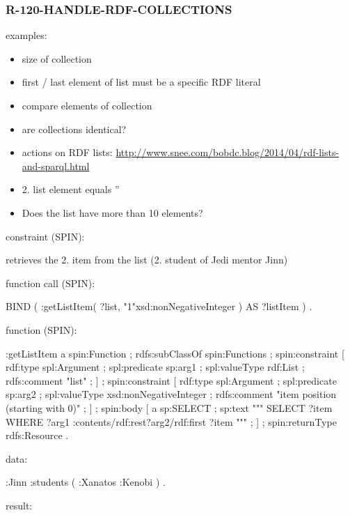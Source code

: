 \documentclass{llncs}
\begin{document}
\subsubsection{R-120-HANDLE-RDF-COLLECTIONS}

examples:

\begin{itemize}
	\item size of collection
	\item first / last element of list must be a specific RDF literal
	\item compare elements of collection
	\item are collections identical?
	\item actions on RDF lists: \url{http://www.snee.com/bobdc.blog/2014/04/rdf-lists-and-sparql.html}
	\item 2. list element equals ''
	\item Does the list have more than 10 elements?
\end{itemize}

constraint (SPIN):

retrieves the 2. item from the list (2. student of Jedi mentor Jinn)

function call (SPIN):

\begin{ex}
BIND ( :getListItem( ?list, "1"xsd:nonNegativeInteger ) AS ?listItem ) .
\end{ex}

function (SPIN):

\begin{ex}
:getListItem
    a spin:Function ; rdfs:subClassOf spin:Functions ;
    spin:constraint [
        rdf:type spl:Argument ;
        spl:predicate sp:arg1 ;
        spl:valueType rdf:List ;
        rdfs:comment "list" ; ] ;
    spin:constraint [
        rdf:type spl:Argument ;
        spl:predicate sp:arg2 ;
        spl:valueType xsd:nonNegativeInteger ;
        rdfs:comment "item position (starting with 0)" ; ] ;
    spin:body [
        a sp:SELECT ;
        sp:text """
            SELECT ?item
            WHERE {
                ?arg1 :contents/rdf:rest{?arg2}/rdf:first ?item } """ ; ] ;
    spin:returnType rdfs:Resource .
\end{ex}

data:

\begin{ex}
:Jinn :students 
     ( :Xanatos :Kenobi ) . 
\end{ex}

result:
\end{document}
